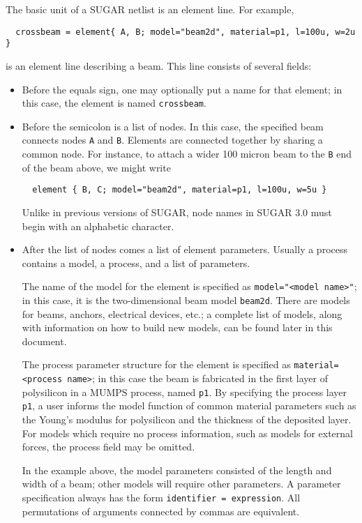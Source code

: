 The basic unit of a SUGAR netlist is an element line. For example,
\begin{verbatim}
  crossbeam = element{ A, B; model="beam2d", material=p1, l=100u, w=2u }
\end{verbatim}
is an element line describing a beam.  This line consists of several
fields:
\begin{itemize}

\item Before the equals sign, one may optionally put a name for that element;  
   in this case, the element is named \texttt{crossbeam}.

\item Before the semicolon is a list of nodes.
   In this case, the specified beam connects nodes \texttt{A} and \texttt{B}.
   Elements are connected together by sharing a common node.  For instance, to
   attach a wider 100 micron beam to the \texttt{B} end of the beam above, 
   we might write
\begin{verbatim}
  element { B, C; model="beam2d", material=p1, l=100u, w=5u }
\end{verbatim}

   Unlike in previous versions of SUGAR, node names in SUGAR 3.0 must
   begin with an alphabetic character. 

\item After the list of nodes comes a list of element parameters. Usually a
   process contains a model, a process, and a list of parameters.

   The name of the model for the element is specified as 
   \texttt{model="<model name>"}; in this case,
   it is the two-dimensional beam model \texttt{beam2d}.  There are models
   for beams, anchors, electrical devices, etc.; a complete list of
   models, along with information on how to build new models, can
   be found later in this document.

   The process parameter structure for the element is specified as
   \texttt{material=<process name>}; 
   in this case the beam is fabricated in the first layer of polysilicon
   in a MUMPS process, named \texttt{p1}.  By specifying the process layer 
   \texttt{p1},
   a user informs the model function of common material parameters such as 
   the Young's modulus for polysilicon and the thickness of the deposited
   layer.  For models which require no process information, such as models 
   for external forces, the process field may be omitted.

   In the example above, the model parameters consisted of the length and width
   of a beam; other models will require other parameters.  A parameter
   specification always has the form \texttt{identifier = expression}.
   All permutations of arguments connected by commas are equivalent.

\end{itemize}

